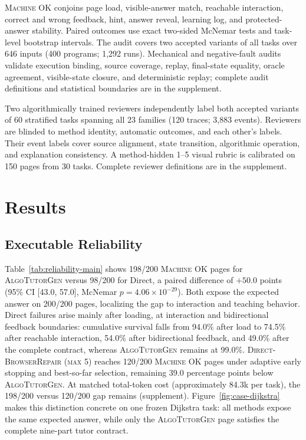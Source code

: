 \documentclass[letterpaper]{article}
\newcommand{\system}{\textsc{AlgoTutorGen}}
\newcommand{\machineok}{\textsc{Machine OK}}
\newcommand{\dbr}{\textsc{Direct-BrowserRepair (max 5)}}
\begin{document}
\machineok{} conjoins page load, visible-answer match, reachable
interaction, correct and wrong feedback, hint, answer reveal, learning
log, and protected-answer stability. Paired outcomes use exact
two-sided McNemar tests and task-level bootstrap intervals. The audit
covers two accepted variants of all tasks over 646 inputs (400
programs; 1,292 runs). Mechanical and negative-fault audits validate
execution binding, source coverage, replay, final-state equality, oracle
agreement, visible-state closure, and deterministic replay; complete
audit definitions and statistical boundaries are in the supplement.

Two algorithmically trained reviewers independently label both accepted
variants of 60 stratified tasks spanning all 23 families (120 traces;
3,883 events). Reviewers are blinded to method identity, automatic
outcomes, and each other's labels. Their event labels cover source
alignment, state transition, algorithmic operation, and explanation
consistency. A method-hidden 1--5 visual rubric is calibrated on 150
pages from 30 tasks. Complete reviewer definitions are in the
supplement.

\section{Results}
\label{sec:results}

\subsection{Executable Reliability}
Table~\ref{tab:reliability-main} shows 198/200 \machineok{} pages for
\system{} versus 98/200 for Direct, a paired difference of \(+50.0\)
points (95\% CI [43.0, 57.0], McNemar
\(p=4.06\times10^{-29}\)). Both expose the expected answer on 200/200
pages, localizing the gap to interaction and teaching behavior. Direct
failures arise mainly after loading, at interaction and bidirectional
feedback boundaries: cumulative survival falls from 94.0\% after load
to 74.5\% after reachable interaction, 54.0\% after bidirectional
feedback, and 49.0\% after the complete contract, whereas \system{}
remains at 99.0\%. \dbr{} reaches 120/200 \machineok{} pages under
adaptive early stopping and best-so-far selection, remaining 39.0
percentage points below \system{}. At matched total-token cost
(approximately 84.3k per task), the 198/200 versus 120/200 gap remains
(supplement).
Figure~\ref{fig:case-dijkstra} makes this distinction concrete on one
frozen Dijkstra task: all methods expose the same expected answer, while
only the \system{} page satisfies the complete nine-part tutor contract.
\end{document}
